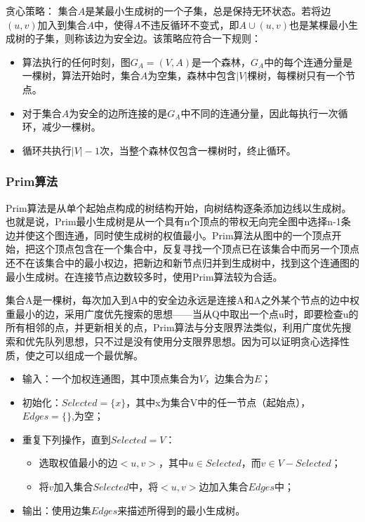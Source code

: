 \documentclass{cumcmthesis}
\begin{document}
贪心策略：
集合$A$是某最小生成树的一个子集，总是保持无环状态。若将边$(u,v)$加入到集合$A$中，使得$A$不违反循环不变式，即$A\cup{(u,v)}$也是某棵最小生成树的子集，则称该边为安全边。该策略应符合一下规则：
\begin{itemize}
  \item 算法执行的任何时刻，图$G_{A}=(V,A)$是一个森林，$G_{A}$中的每个连通分量是一棵树，算法开始时，集合$A$为空集，森林中包含$|V|$棵树，每棵树只有一个节点。
  \item 对于集合$A$为安全的边所连接的是$G_{A}$中不同的连通分量，因此每执行一次循环，减少一棵树。
  \item 循环共执行$|V|-1$次，当整个森林仅包含一棵树时，终止循环。
\end{itemize}

\subsubsection{Prim算法}
  Prim算法是从单个起始点构成的树结构开始，向树结构逐条添加边线以生成树。也就是说，Prim最小生成树是从一个具有n个顶点的带权无向完全图中选择n-1条边并使这个图连通，同时使生成树的权值最小。Prim算法从图中的一个顶点开始，把这个顶点包含在一个集合中，反复寻找一个顶点已在该集合中而另一个顶点还不在该集合中的最小权边，把新边和新节点归并到生成树中，找到这个连通图的最小生成树。在连接节点边数较多时，使用Prim算法较为合适。

  集合A是一棵树，每次加入到A中的安全边永远是连接A和A之外某个节点的边中权重最小的边，采用广度优先搜索的思想——当从Q中取出一个点u时，即要检查u的所有相邻的点，并更新相关的点，Prim算法与分支限界法类似，利用广度优先搜索和优先队列思想，只不过是没有使用分支限界思想。因为可以证明贪心选择性质，使之可以组成一个最优解。
  
\begin{itemize}
  \item 输入：一个加权连通图，其中顶点集合为$V$，边集合为$E$；

  \item 初始化：$Selected = \{x\}$，其中x为集合V中的任一节点（起始点），$Edges = \{\}$,为空；
  
  \item 重复下列操作，直到$Selected = V$：
  \begin{itemize}
    \item 选取权值最小的边$<u, v>$，其中$u \in Selected$，而$v \in V-Selected$；
  
    \item 将$v$加入集合$Selected$中，将$<u, v>$边加入集合$Edges$中；
  \end{itemize}
  \item 输出：使用边集$Edges$来描述所得到的最小生成树。
\end{itemize}
\end{document}
